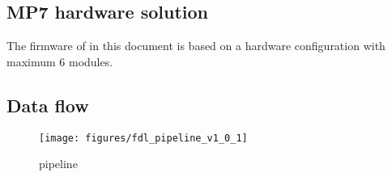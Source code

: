 \subsection{MP7 \finor hardware solution}

The firmware of \ufdl in this document is based on a hardware configuration with maximum 6 \ugt modules.

\subsection{Data flow}
\label{sec:fdl:data_flow}

\begin{figure}[htb]
\centering
\texttt{[image: figures/fdl\_pipeline\_v1\_0\_1]}
\caption{\ufdl pipeline}
\label{fig:fdl:mFDL_pipeline}
\end{figure}

